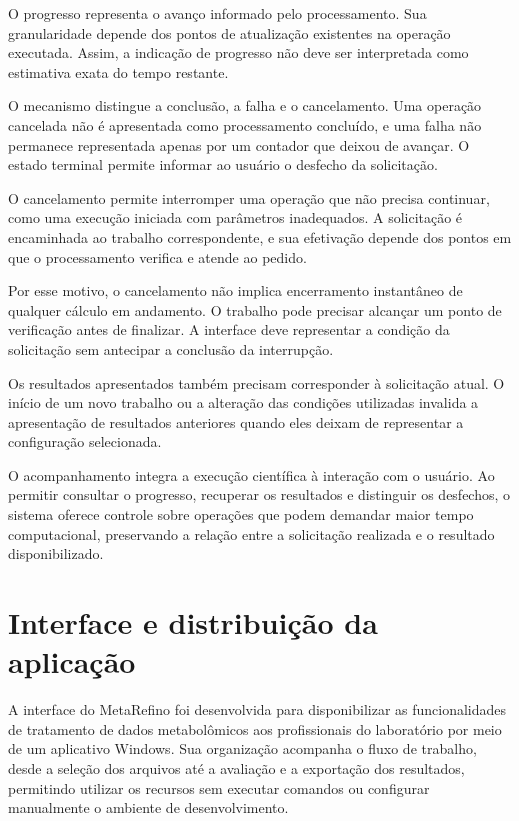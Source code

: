 O progresso representa o avanço informado pelo processamento. Sua granularidade depende dos pontos de atualização existentes na operação executada. Assim, a indicação de progresso não deve ser interpretada como estimativa exata do tempo restante.

O mecanismo distingue a conclusão, a falha e o cancelamento. Uma operação cancelada não é apresentada como processamento concluído, e uma falha não permanece representada apenas por um contador que deixou de avançar. O estado terminal permite informar ao usuário o desfecho da solicitação.

O cancelamento permite interromper uma operação que não precisa continuar, como uma execução iniciada com parâmetros inadequados. A solicitação é encaminhada ao trabalho correspondente, e sua efetivação depende dos pontos em que o processamento verifica e atende ao pedido.

Por esse motivo, o cancelamento não implica encerramento instantâneo de qualquer cálculo em andamento. O trabalho pode precisar alcançar um ponto de verificação antes de finalizar. A interface deve representar a condição da solicitação sem antecipar a conclusão da interrupção.

Os resultados apresentados também precisam corresponder à solicitação atual. O início de um novo trabalho ou a alteração das condições utilizadas invalida a apresentação de resultados anteriores quando eles deixam de representar a configuração selecionada.

O acompanhamento integra a execução científica à interação com o usuário. Ao permitir consultar o progresso, recuperar os resultados e distinguir os desfechos, o sistema oferece controle sobre operações que podem demandar maior tempo computacional, preservando a relação entre a solicitação realizada e o resultado disponibilizado.

\section{Interface e distribuição da aplicação}
\label{sec:interface-distribuicao}

A interface do MetaRefino foi desenvolvida para disponibilizar as funcionalidades de tratamento de dados metabolômicos aos profissionais do laboratório por meio de um aplicativo Windows. Sua organização acompanha o fluxo de trabalho, desde a seleção dos arquivos até a avaliação e a exportação dos resultados, permitindo utilizar os recursos sem executar comandos ou configurar manualmente o ambiente de desenvolvimento.

